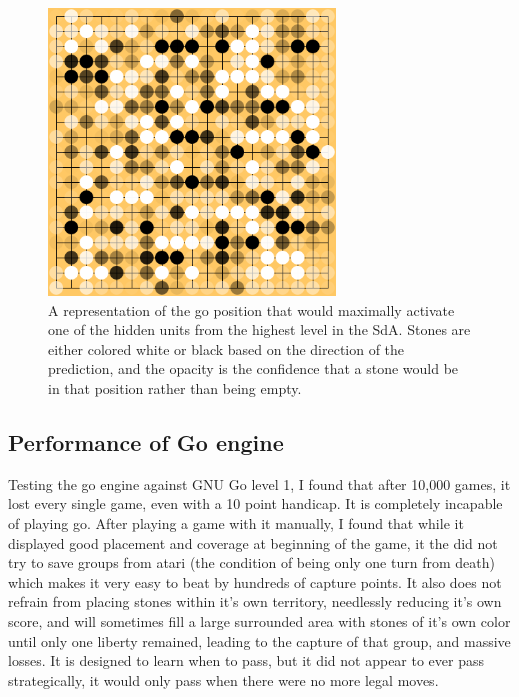 \documentclass[12pt]{article}
\begin{document}
\begin{figure}[htb]
\begin{center}
\includegraphics[height=3.0in,width=3.0in]{screen-0204}
\caption{A representation of the go position that would maximally activate one of the hidden units from the highest level in the SdA. Stones are either colored white or black based on the direction of the prediction, and the opacity is the confidence that a stone would be in that position rather than being empty.}
\end{center}
\end{figure}
		
	\subsection{Performance of Go engine}
	
Testing the go engine against GNU Go level 1, I found that after 10,000 games, it lost every single game, even with a 10 point handicap. It is completely incapable of playing go. After playing a game with it manually, I found that while it displayed good placement and coverage at beginning of the game, it the did not try to save groups from atari (the condition of being only one turn from death) which makes it very easy to beat by hundreds of capture points. It also does not refrain from placing stones within it's own territory, needlessly reducing it's own score, and will sometimes fill a large surrounded area with stones of it's own color until only one liberty remained, leading to the capture of that group, and massive losses. It is designed to learn when to pass, but it did not appear to ever pass strategically, it would only pass when there were no more legal moves. 
\end{document}
